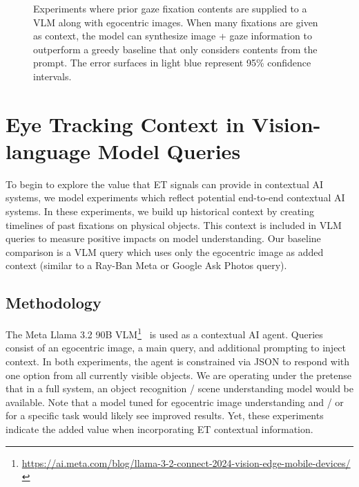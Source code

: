 \begin{figure}[t]
    \centering
    \caption{Experiments where prior gaze fixation contents are supplied to a VLM along with egocentric images.  When many fixations are given as context, the model can synthesize image + gaze information to outperform a greedy baseline that only considers contents from the prompt. The error surfaces in light blue represent 95\% confidence intervals.}
    \label{fig:e1e2}
\end{figure}

\section{Eye Tracking Context in Vision-language Model Queries}

To begin to explore the value that ET signals can provide in contextual AI systems, we model experiments which reflect potential end-to-end contextual AI systems.  In these experiments, we build up historical context by creating timelines of past fixations on physical objects.  This context is included in VLM queries to measure positive impacts on model understanding.  Our baseline comparison is a VLM query which uses only the egocentric image as added context (similar to a Ray-Ban Meta or Google Ask Photos query).

\subsection{Methodology}

The Meta Llama 3.2 90B VLM\footnote{\url{https://ai.meta.com/blog/llama-3-2-connect-2024-vision-edge-mobile-devices/}}~\cite{grattafiori_llama_2024} is used as a contextual AI agent.  Queries consist of an egocentric image, a main query, and additional prompting to inject context.  In both experiments, the agent is constrained via JSON to respond with one option from all currently visible objects.  We are operating under the pretense that in a full system, an object recognition / scene understanding model would be available.  Note that a model tuned for egocentric image understanding and / or for a specific task would likely see improved results.  Yet, these experiments indicate the added value when incorporating ET contextual information.

